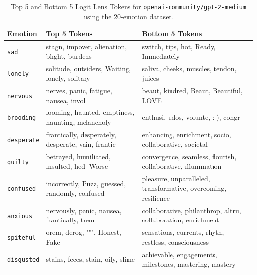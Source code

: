 \begin{table}[!htbp]
\centering
\small
\caption{Top 5 and Bottom 5 Logit Lens Tokens for \texttt{openai-community/gpt-2-medium} using the 20-emotion dataset.}
\label{tab:gpt2_logitlens_20}

    \begin{tabularx}{\linewidth}{p{1.6cm}XX}
    \toprule
    \textbf{Emotion} & \textbf{Top 5 Tokens} & \textbf{Bottom 5 Tokens} \\
    \midrule

    \texttt{sad} &
    stagn, impover, alienation, blight, burdens &
    switch, tips, hot, Ready, Immediately \\[0.4em]

    \texttt{lonely} &
    solitude, outsiders, Waiting, lonely, solitary &
    saliva, cheeks, muscles, tendon, juices \\[0.4em]

    \texttt{nervous} &
    nerves, panic, fatigue, nausea, invol &
    beaut, kindred, Beaut, Beautiful, LOVE \\[0.4em]

    \texttt{brooding} &
    looming, haunted, emptiness, haunting, melancholy &
    enthusi, udos, volunte, :-), congr \\[0.4em]

    \texttt{desperate} &
    frantically, desperately, desperate, vain, frantic &
    enhancing, enrichment, socio, collaborative, societal \\[0.4em]

    \texttt{guilty} &
    betrayed, humiliated, insulted, lied, Worse &
    convergence, seamless, flourish, collaborative, illumination \\[0.4em]

    \texttt{confused} &
    incorrectly, Puzz, guessed, randomly, confused &
    pleasure, unparalleled, transformative, overcoming, resilience \\[0.4em]

    \texttt{anxious} &
    nervously, panic, nausea, frantically, trem &
    collaborative, philanthrop, altru, collaboration, enrichment \\[0.4em]

    \texttt{spiteful} &
    orem, derog, """, Honest, Fake &
    sensations, currents, rhyth, restless, consciousness \\[0.4em]

    \texttt{disgusted} &
    stains, feces, stain, oily, slime &
    achievable, engagements, milestones, mastering, mastery \\[0.4em]


\end{tabularx}
\end{table}
